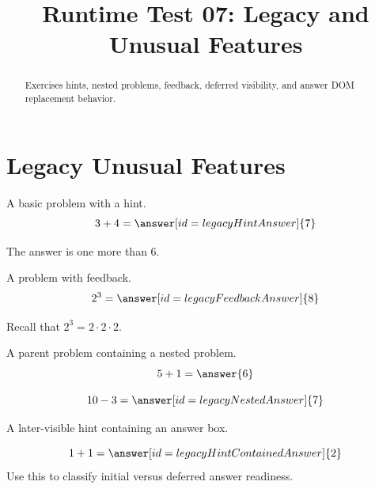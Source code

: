 \documentclass{ximera}
\title{Runtime Test 07: Legacy and Unusual Features}
\begin{document}
\begin{abstract}
Exercises hints, nested problems, feedback, deferred visibility, and answer DOM
replacement behavior.
\end{abstract}
\maketitle

\section{Legacy Unusual Features}


\begin{problem}
A basic problem with a hint.
\[
3+4=\answer[id=legacyHintAnswer]{7}
\]
\begin{hint}
The answer is one more than \(6\).
\end{hint}
\end{problem}

\begin{problem}
A problem with feedback.
\[
2^3=\answer[id=legacyFeedbackAnswer]{8}
\]
\begin{feedback}
Recall that \(2^3=2\cdot2\cdot2\).
\end{feedback}
\end{problem}

\begin{problem}
A parent problem containing a nested problem.
\[ 5+1 = \answer{6} \]
\begin{problem}
\[
10-3=\answer[id=legacyNestedAnswer]{7}
\]
\end{problem}

\end{problem}

\begin{problem}
A later-visible hint containing an answer box.
\begin{hint}
\[
1+1=\answer[id=legacyHintContainedAnswer]{2}
\]
Use this to classify initial versus deferred answer readiness.
\end{hint}
\end{problem}
\end{document}
